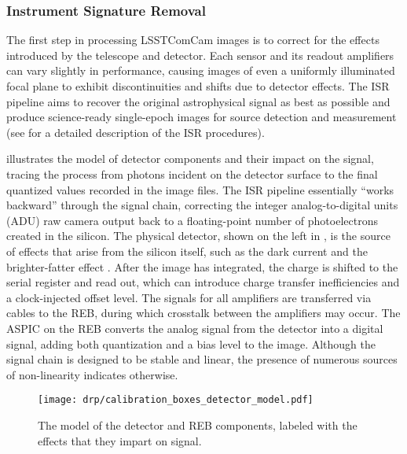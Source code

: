 \subsubsection{Instrument Signature Removal}
\label{ssec:isr}
The first step in processing \gls{LSSTComCam} images is to correct for the effects introduced by the telescope and detector.
Each sensor and its readout amplifiers can vary slightly in performance, causing images of even a uniformly illuminated focal plane to exhibit discontinuities and shifts due to detector effects.
The \gls{ISR} pipeline aims to recover the original astrophysical signal as best as possible and produce science-ready single-epoch images for source detection and measurement (see \citealt{SITCOMTN-086,2025JATIS..11a1209P} for a detailed description of the \gls{ISR} procedures).

 illustrates the model of detector components and their impact on the signal, tracing the process from photons incident on the detector surface to the final quantized values recorded in the image files.
The \gls{ISR} \gls{pipeline} essentially ``works backward'' through the signal chain, correcting the integer analog-to-digital units (ADU) raw camera output back to a floating-point number of photoelectrons created in the silicon.
The physical detector, shown on the left in  , is the source of effects that arise from the silicon itself, such as the dark current and the brighter-fatter effect \citep{doi:10.1088/1538-3873/aab820,2024PASP..136d5003B}.
After the image has integrated, the charge is shifted  to the serial register and read out, which can introduce charge transfer inefficiencies and a clock-injected offset level.
The signals for all amplifiers are transferred via cables to the \gls{REB}, during which crosstalk between the amplifiers may occur.
The \gls{ASPIC} on the \gls{REB} converts the analog signal from the detector into a digital signal, adding both quantization and a bias level to the image.
Although the signal chain is designed to be stable and linear, the presence of numerous sources of non-linearity indicates otherwise.
\begin{figure}[htb]
  \centering
  \texttt{[image: drp/calibration\_boxes\_detector\_model.pdf]}
  \caption{The model of the detector and \gls{REB} components, labeled with the effects that they impart on signal.}
  \label{fig:isr_signal_chain}
\end{figure}

